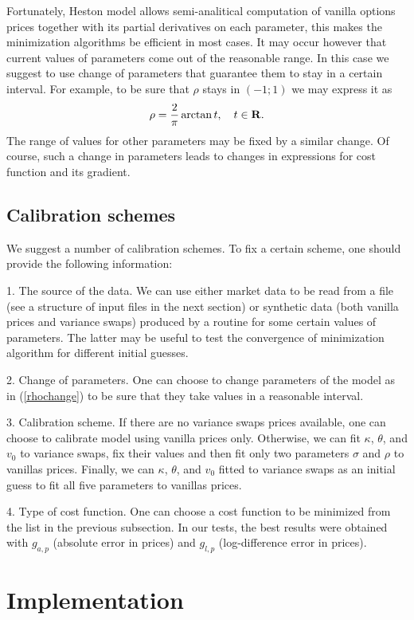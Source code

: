\documentclass[12pt,amsfonts,enumerate,amscd]{amsart}
\numberwithin{table}{section}
\numberwithin{equation}{section}
\newcommand{\eq}[1]{(\ref{#1})}
\newcommand{\bbe}{\begin{equation}\label}
\newcommand{\ee}{\end{equation}}
\newcommand{\R}{{\bf R}}
\begin{document}
Fortunately, Heston model allows semi-analitical computation of vanilla options prices together with its partial derivatives on each parameter, this makes the minimization algorithms be efficient in most cases.
It may occur however that current values of parameters come out of the reasonable range. In this case we suggest to use change of parameters that guarantee them to stay in a certain interval. For example, to be sure that $\rho$  stays in $(-1;1)$ we may express it as
\bbe{rhochange}
\rho = \frac{2}{\pi}\arctan t, \quad t\in\R.
 \ee
The range of values for other parameters may be fixed by a similar change. Of course, such a change in parameters leads to changes in expressions for cost function and its gradient.
 
\subsection{Calibration schemes}

We suggest a number of calibration schemes. To fix a certain scheme, one should provide the following information:

\vskip0.2cm
1. The source of the data. We can use either market data to be read from a file (see a structure of input files in the next section) or synthetic data (both vanilla prices and variance swaps) produced by a routine for some certain values of parameters. The latter may be useful to test the convergence of minimization algorithm for different initial guesses.

\vskip0.2cm
2. Change of parameters. One can choose to change parameters of the model as in \eq{rhochange} to be sure that they take values in a reasonable interval.

\vskip0.2cm
 3. Calibration scheme. If there are no variance swaps prices available, one can choose to calibrate model using vanilla prices only. Otherwise, we can fit $\kappa$, $\theta$, and $v_0$ to variance swaps, fix their values  and then fit only two parameters $\sigma$ and $\rho$ to vanillas prices. Finally, we can $\kappa$, $\theta$, and $v_0$ fitted to variance swaps as an initial guess to fit all five parameters to vanillas prices.

\vskip0.2cm
4. Type of cost function. One can choose a cost function to be minimized from the list in the previous subsection.   In our tests, the best results were obtained with $g_{a, p}$ (absolute error in prices) and $g_{l, p}$ (log-difference error in prices).

\section{Implementation} 
\end{document}

